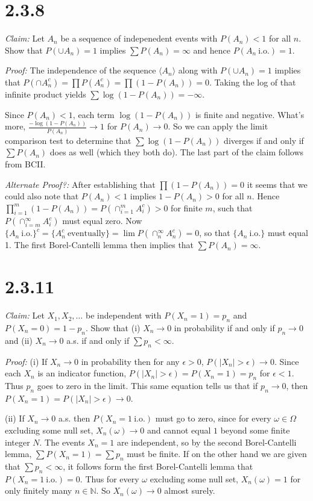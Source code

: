 \documentclass[10pt]{article}
\begin{document}
\section*{2.3.8}
\textit{Claim:} Let $A_n$ be a sequence of indepenedent events
with $P(A_n) < 1$ for all $n$. Show that $P(\cup A_n) = 1$
implies $\sum P(A_n) = \infty$ and hence $P(A_n\ \text{i.o.}) = 1$.

\textit{Proof:} The independence of the sequence $\langle A_n \rangle$
along with $P(\cup A_n) = 1$ implies that
$P(\cap A_n^c) = \prod P(A_n^c) = \prod (1-P(A_n))=0$.
Taking the log of that infinite product yields $\sum \log (1-P(A_n)) = -\infty$.

Since $P(A_n) < 1$, each term $\log(1-P(A_n))$ is finite and negative.
What's more, $\frac{-\log(1-P(A_n))}{P(A_n)} \to 1$ for $P(A_n) \to 0$.
So we can apply the limit comparison test to determine that
$\sum \log (1-P(A_n))$ diverges if and only if $\sum P(A_n)$
does as well (which they both do). 
The last part of the claim follows from BCII.


\textit{Alternate Proof?:}
After establishing that $\prod (1-P(A_n))=0$
it seems that we could also note that
$P(A_n) < 1$ implies  $1-P(A_n)>0$ for all $n$.
Hence $\prod_{i=1}^m (1-P(A_n)) = P(\cap_{i=1}^m A_i^c) > 0$ 
for finite $m$, such that $P(\cap_{i=m}^\infty A_i^c)$ must equal zero. 
Now $\{A_n \ \text{i.o.}\}^c = \{A_n^c \ \text{eventually}\}
= \lim P(\cap_n^\infty A_n^c) = 0$,
so that $\{A_n \ \text{i.o.}\}$ must equal 1.
The first Borel-Cantelli lemma then implies that 
$\sum P(A_n) = \infty$.

\section*{2.3.11}
\textit{Claim:} Let $X_1, X_2, \dots$ be independent with $P(X_n=1)=p_n$
and $P(X_n=0)=1-p_n$. Show that (i) $X_n \to 0$ in probability
if and only if $p_n \to 0$ and (ii) $X_n \to 0$ a.s. if and only if
$\sum p_n < \infty$.

\textit{Proof:} (i) If $X_n \to 0$ in probability then
for any $\epsilon > 0 $, $P(\vert X_n \vert > \epsilon) \to 0$.
Since each $X_n$ is an indicator function, $P(\vert X_n \vert > \epsilon)
= P(X_n = 1) = p_n$ for $\epsilon < 1$.
Thus $p_n$ goes to zero in the limit. This same equation tells us that 
if $p_n \to 0$, then $P(X_n=1) = P(\vert X_n \vert > \epsilon) \to 0$.

(ii) If $X_n \to 0$ a.s. then  $P(X_n=1 \ \text{i.o.})$
must go to zero, since for every $\omega \in \Omega$
excluding some null set, $X_n(\omega) \to 0$ and cannot equal $1$
beyond some finite integer $N$.
The events $X_n = 1$ are independent, so by the second Borel-Cantelli lemma,
$\sum P(X_n=1) = \sum p_n$ must be finite.
If on the other hand we are given that $\sum p_n < \infty$,
it follows form the first Borel-Cantelli lemma that 
$P(X_n=1 \ \text{i.o.}) = 0$. Thus for every $\omega$ excluding some null set,
$X_n(\omega) = 1$ for only finitely many $n \in \mathbb{N}$.
So $X_n(\omega) \to 0$ almost surely.
\end{document}

